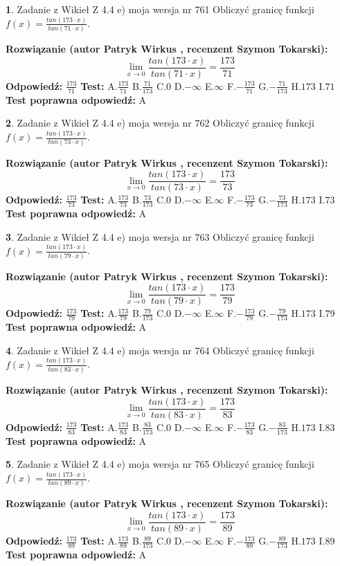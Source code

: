 \documentclass[12pt, a4paper]{article}
\theoremstyle{definition} %
\newtheorem{zad}{}
\newcommand{\zadStart}[1]{\begin{zad}#1\newline}
\newcommand{\zadStop}{\end{zad}}
\newcommand{\rozwStart}[2]{\noindent \textbf{Rozwiązanie (autor #1 , recenzent #2): }\newline}
\newcommand{\rozwStop}{\newline}
\newcommand{\odpStart}{\noindent \textbf{Odpowiedź:}\newline}
\newcommand{\odpStop}{\newline}
\newcommand{\testStart}{\noindent \textbf{Test:}\newline}
\newcommand{\testStop}{\newline}
\newcommand{\kluczStart}{\noindent \textbf{Test poprawna odpowiedź:}\newline}
\newcommand{\kluczStop}{\newline}
\begin{document}
\zadStart{Zadanie z Wikieł Z 4.4 e) moja wersja nr 761}
Obliczyć granicę funkcji $f(x)=\frac{tan(173\cdot x)}{tan(71\cdot x)}$.
\zadStop
\rozwStart{Patryk Wirkus}{Szymon Tokarski}
$$\lim\limits_{x\to 0}\frac{tan(173\cdot x)}{tan(71\cdot x)}=
\frac{173}{71}$$
\rozwStop
\odpStart
$\frac{173}{71}$
\odpStop
\testStart
A.$\frac{173}{71}$
B.$\frac{71}{173}$
C.$0$
D.$-\infty$
E.$\infty$
F.$-\frac{173}{71}$
G.$-\frac{71}{173}$
H.$173$
I.$71$
\testStop
\kluczStart
A
\kluczStop



\zadStart{Zadanie z Wikieł Z 4.4 e) moja wersja nr 762}
Obliczyć granicę funkcji $f(x)=\frac{tan(173\cdot x)}{tan(73\cdot x)}$.
\zadStop
\rozwStart{Patryk Wirkus}{Szymon Tokarski}
$$\lim\limits_{x\to 0}\frac{tan(173\cdot x)}{tan(73\cdot x)}=
\frac{173}{73}$$
\rozwStop
\odpStart
$\frac{173}{73}$
\odpStop
\testStart
A.$\frac{173}{73}$
B.$\frac{73}{173}$
C.$0$
D.$-\infty$
E.$\infty$
F.$-\frac{173}{73}$
G.$-\frac{73}{173}$
H.$173$
I.$73$
\testStop
\kluczStart
A
\kluczStop



\zadStart{Zadanie z Wikieł Z 4.4 e) moja wersja nr 763}
Obliczyć granicę funkcji $f(x)=\frac{tan(173\cdot x)}{tan(79\cdot x)}$.
\zadStop
\rozwStart{Patryk Wirkus}{Szymon Tokarski}
$$\lim\limits_{x\to 0}\frac{tan(173\cdot x)}{tan(79\cdot x)}=
\frac{173}{79}$$
\rozwStop
\odpStart
$\frac{173}{79}$
\odpStop
\testStart
A.$\frac{173}{79}$
B.$\frac{79}{173}$
C.$0$
D.$-\infty$
E.$\infty$
F.$-\frac{173}{79}$
G.$-\frac{79}{173}$
H.$173$
I.$79$
\testStop
\kluczStart
A
\kluczStop



\zadStart{Zadanie z Wikieł Z 4.4 e) moja wersja nr 764}
Obliczyć granicę funkcji $f(x)=\frac{tan(173\cdot x)}{tan(83\cdot x)}$.
\zadStop
\rozwStart{Patryk Wirkus}{Szymon Tokarski}
$$\lim\limits_{x\to 0}\frac{tan(173\cdot x)}{tan(83\cdot x)}=
\frac{173}{83}$$
\rozwStop
\odpStart
$\frac{173}{83}$
\odpStop
\testStart
A.$\frac{173}{83}$
B.$\frac{83}{173}$
C.$0$
D.$-\infty$
E.$\infty$
F.$-\frac{173}{83}$
G.$-\frac{83}{173}$
H.$173$
I.$83$
\testStop
\kluczStart
A
\kluczStop



\zadStart{Zadanie z Wikieł Z 4.4 e) moja wersja nr 765}
Obliczyć granicę funkcji $f(x)=\frac{tan(173\cdot x)}{tan(89\cdot x)}$.
\zadStop
\rozwStart{Patryk Wirkus}{Szymon Tokarski}
$$\lim\limits_{x\to 0}\frac{tan(173\cdot x)}{tan(89\cdot x)}=
\frac{173}{89}$$
\rozwStop
\odpStart
$\frac{173}{89}$
\odpStop
\testStart
A.$\frac{173}{89}$
B.$\frac{89}{173}$
C.$0$
D.$-\infty$
E.$\infty$
F.$-\frac{173}{89}$
G.$-\frac{89}{173}$
H.$173$
I.$89$
\testStop
\kluczStart
A
\kluczStop
\end{document}
